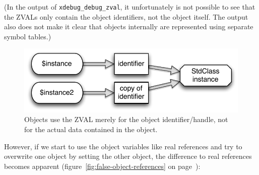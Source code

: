 (In the output of \texttt{xdebug\_debug\_zval}, it unfortunately is not possible to see that the ZVALs only contain the object identifiers, not the object itself. The output also does not make it clear that objects internally are represented using separate symbol tables.)

\begin{figure}[htb]
  \begin{center}
    \includegraphics[scale=0.8]{images/instance_instance2}
    \caption{Objects use the ZVAL merely for the object identifier/handle, not for the actual data contained in the object.}
    \label{fig:objects-as-references}
  \end{center}
\end{figure}

However, if we start to use the object variables like real references and try to overwrite one object by setting the other object, the difference to real references becomes apparent (figure~\ref{fig:false-object-references} on page~\pageref{fig:false-object-references}):



